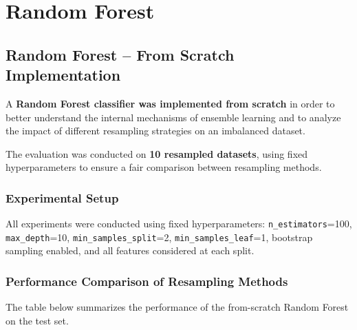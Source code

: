 \section{Random Forest}


\subsection{Random Forest -- From Scratch Implementation}

A \textbf{Random Forest classifier was implemented from scratch} in order to
better understand the internal mechanisms of ensemble learning and to analyze
the impact of different resampling strategies on an imbalanced dataset.

The evaluation was conducted on \textbf{10 resampled datasets}, using fixed
hyperparameters to ensure a fair comparison between resampling methods.

\subsubsection{Experimental Setup}

All experiments were conducted using fixed hyperparameters: \texttt{n\_estimators}=100, \texttt{max\_depth}=10, \texttt{min\_samples\_split}=2, \texttt{min\_samples\_leaf}=1, bootstrap sampling enabled, and all features considered at each split.



\subsubsection{Performance Comparison of Resampling Methods}

The table below summarizes the performance of the
from-scratch Random Forest on the test set.

